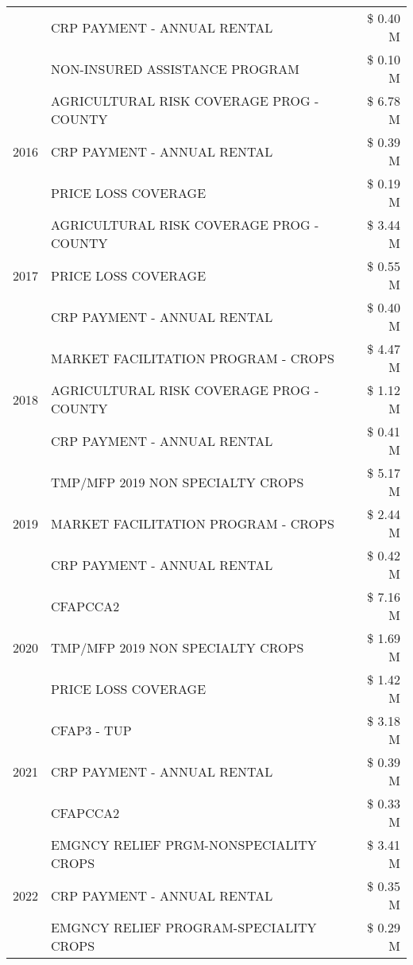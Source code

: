 \begin{tabular}{llr}
 & CRP PAYMENT - ANNUAL RENTAL & \$ 0.40 M \\
 & NON-INSURED ASSISTANCE PROGRAM & \$ 0.10 M \\
\cline{1-3}
\multirow[t]{3}{*}{2016} & AGRICULTURAL RISK COVERAGE PROG - COUNTY & \$ 6.78 M \\
 & CRP PAYMENT - ANNUAL RENTAL & \$ 0.39 M \\
 & PRICE LOSS COVERAGE & \$ 0.19 M \\
\cline{1-3}
\multirow[t]{3}{*}{2017} & AGRICULTURAL RISK COVERAGE PROG - COUNTY & \$ 3.44 M \\
 & PRICE LOSS COVERAGE & \$ 0.55 M \\
 & CRP PAYMENT - ANNUAL RENTAL & \$ 0.40 M \\
\cline{1-3}
\multirow[t]{3}{*}{2018} & MARKET FACILITATION PROGRAM - CROPS & \$ 4.47 M \\
 & AGRICULTURAL RISK COVERAGE PROG - COUNTY & \$ 1.12 M \\
 & CRP PAYMENT - ANNUAL RENTAL & \$ 0.41 M \\
\cline{1-3}
\multirow[t]{3}{*}{2019} & TMP/MFP 2019 NON SPECIALTY CROPS & \$ 5.17 M \\
 & MARKET FACILITATION PROGRAM - CROPS & \$ 2.44 M \\
 & CRP PAYMENT - ANNUAL RENTAL & \$ 0.42 M \\
\cline{1-3}
\multirow[t]{3}{*}{2020} & CFAPCCA2 & \$ 7.16 M \\
 & TMP/MFP 2019 NON SPECIALTY CROPS & \$ 1.69 M \\
 & PRICE LOSS COVERAGE & \$ 1.42 M \\
\cline{1-3}
\multirow[t]{3}{*}{2021} & CFAP3 - TUP & \$ 3.18 M \\
 & CRP PAYMENT - ANNUAL RENTAL & \$ 0.39 M \\
 & CFAPCCA2 & \$ 0.33 M \\
\cline{1-3}
\multirow[t]{3}{*}{2022} & EMGNCY RELIEF PRGM-NONSPECIALITY CROPS & \$ 3.41 M \\
 & CRP PAYMENT - ANNUAL RENTAL & \$ 0.35 M \\
 & EMGNCY RELIEF PROGRAM-SPECIALITY CROPS & \$ 0.29 M \\
\cline{1-3}
\bottomrule
\end{tabular}
